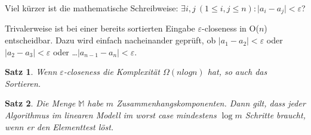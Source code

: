 \documentclass[ngerman,draft,parskip=half*,twoside]{scrreprt}
\theoremstyle{break}
\newtheorem{satz}{Satz}
\begin{document}
Viel kürzer ist die mathematische Schreibweise: \( \exists   i,  j \ (1 \leq i, j \leq n):\vert a_i - a_j \vert < \varepsilon \)?

Trivalerweise ist bei einer bereits sortierten Eingabe $\varepsilon$-closeness in O($n$) entscheidbar. Dazu wird einfach nacheinander
geprüft, ob \( \vert a_1 - a_2 \vert < \varepsilon \) oder \( \vert a_2 - a_3 \vert < \varepsilon \) oder \dots \( \vert a_{n-1} -
a_n \vert < \varepsilon \).

\begin{satz} 
Wenn $\varepsilon$-closeness die Komplexität $\Omega (n  log  n)$ hat, so auch das Sortieren.
\end{satz}		
		
\begin{satz}
Die Menge  \( \mathbb{M}  \) habe $m$ Zusammenhangskomponenten. Dann gilt, dass jeder Algorithmus im linearen Modell im worst case
mindestens \( \log m \) Schritte braucht, wenn er den Elementtest löst.
\end{satz}
		 	
\end{document}
